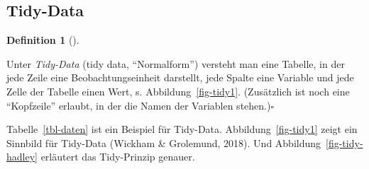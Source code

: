 \documentclass[
  a4paper,
  DIV=11]{scrreprt}
\theoremstyle{definition}
\theoremstyle{definition}
\theoremstyle{definition}
\newtheorem{definition}{Definition}[chapter]
\theoremstyle{remark}
\begin{document}
\subsection{Tidy-Data}\label{tidy-data}

\begin{definition}[]\protect\hypertarget{def-tidy}{}\label{def-tidy}

Unter \emph{Tidy-Data} (tidy data, ``Normalform'') versteht man eine
Tabelle, in der jede Zeile eine Beobachtungseinheit darstellt, jede
Spalte eine Variable und jede Zelle der Tabelle einen Wert, s.
Abbildung~\ref{fig-tidy1}. (Zusätzlich ist noch eine ``Kopfzeile''
erlaubt, in der die Namen der Variablen stehen.)\(\square\)

\end{definition}

Tabelle~\ref{tbl-daten} ist ein Beispiel für Tidy-Data.
Abbildung~\ref{fig-tidy1} zeigt ein Sinnbild für Tidy-Data (Wickham \&
Grolemund, 2018). Und Abbildung~\ref{fig-tidy-hadley} erläutert das
Tidy-Prinzip genauer.
\end{document}
